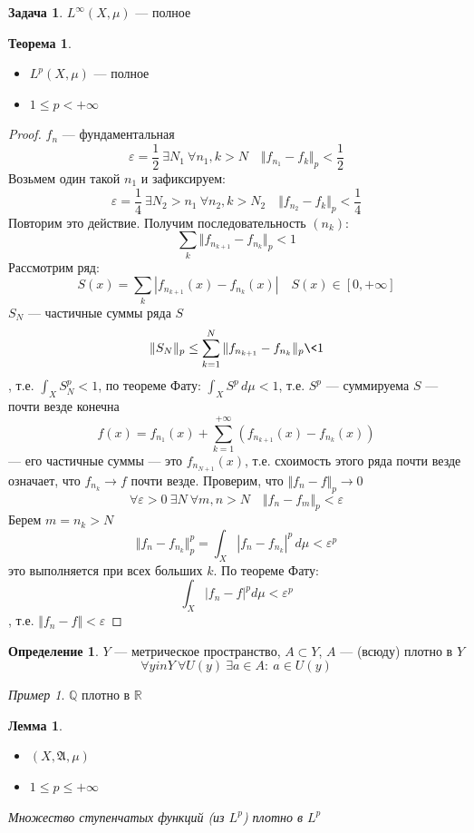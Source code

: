 \documentclass[english]{article}
\newcommand{\R}{\mathbb{R}}
\newcommand{\A}{\mathfrak{A}}
\theoremstyle{plain}
\newtheorem{lemma}{Лемма}
\theoremstyle{remark}
\newtheorem*{examp}{Пример}
\theoremstyle{definition}
\newtheorem{task}{Задача}
\newtheorem{theorem}{Теорема}[section]
\newtheorem*{definition}{Определение}
\begin{document}
\color{black}
\begin{task}
\(L^{\infty}(X, \mu)\) --- полное
\end{task}
\begin{theorem}
\-
\begin{itemize}
\item \(L^p(X, \mu)\) --- полное
\item \(1 \le p < +\infty\)
\end{itemize}
\end{theorem}
\begin{proof}
\(f_n\) --- фундаментальная
\[ \varepsilon = \frac{1}{2}\ \exists N_1\ \forall n_1, k > N\quad \Vert f_{n_1} - f_k \Vert_p < \frac{1}{2} \]
Возьмем один такой \(n_1\) и зафиксируем:
\[ \varepsilon = \frac{1}{4}\ \exists N_2 > n_1\ \forall n_2, k > N_2\quad \Vert f_{n_2} - f_k \Vert_p < \frac{1}{4} \]
Повторим это действие. Получим последовательность \((n_k)\):
\[ \sum_k \Vert f_{n_{k + 1}} - f_{n_k} \Vert_p < 1 \]
Рассмотрим ряд:
\[S(x) = \sum_k |f_{n_{k + 1}}(x) - f_{n_k}(x) |\quad S(x) \in [0, +\infty]\]
\(S_N\) --- частичные суммы ряда \(S\)
\[ \Vert S_N \Vert_p \le \sum_{k = 1}^N \Vert f_{n_{k + 1}} - f_{n_k} \Vert_p \< 1 \]
, т.е. \(\int_X S_N^p < 1\), по теореме Фату: \(\int_X S^p\,d\mu < 1\), т.е. \(S^p\) --- суммируема \implies \(S\) --- почти везде конечна 
\[ f(x) = f_{n_1}(x) + \sum_{k = 1}^{+\infty} (f_{n_{k + 1}}(x) - f_{n_k}(x)) \]
--- его частичные суммы --- это \(f_{n_{N + 1}}(x)\), т.е. схоимость этого ряда почти везде означает, что \(f_{n_k} \to f\) почти везде. Проверим, что \(\Vert f_n - f \Vert_p \to 0\)
\[ \forall \varepsilon > 0\ \exists N\ \forall m,n > N\quad \Vert f_n - f_m \Vert_p < \varepsilon \]
Берем \(m = n_k > N\)
\[ \Vert f_n - f_{n_k} \Vert_p^p = \int_X |f_n - f_{n_k} | ^p\,d\mu < \varepsilon^p \]
это выполняется при всех больших \(k\). По теореме Фату:
\[ \int_X | f_n - f |^p d\mu < \varepsilon^p \]
, т.е. \(\Vert f_n - f \Vert < \varepsilon\)
\end{proof}
\begin{definition}
\(Y\) --- метрическое пространство, \(A \subset Y\), \(A\) --- (всюду) плотно в \(Y\)
\[ \forall y in Y\ \forall U(y)\ \exists a \in A:\ a\in U(y) \]
\end{definition}
\begin{examp}
\(\mathbb{Q}\) плотно в \(\R\)
\end{examp}
\begin{lemma}
\-
\begin{itemize}
\item \((X, \A, \mu)\)
\item \(1 \le p \le +\infty\)
\end{itemize}
Множество ступенчатых функций (из \(L^p\)) плотно в \(L^p\)
\end{lemma}
\end{document}
